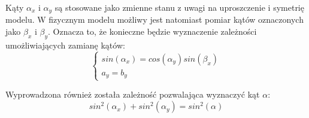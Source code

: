 \documentclass[10pt]{article}
\begin{document}
Kąty $\alpha_x$ i $\alpha_y$ są stosowane jako zmienne stanu z uwagi na uproszczenie i symetrię modelu. W fizycznym modelu możliwy jest natomiast pomiar kątów oznaczonych jako $\beta_x$ i $\beta_y$. Oznacza to, że konieczne będzie wyznaczenie zależności umożliwiających zamianę kątów:
\begin{equation}
\begin{cases}
sin(\alpha_x) = cos(\alpha_y)sin(\beta_x) \\
a_y = b_y
\end{cases}
\end{equation}

Wyprowadzona również została zależność pozwalająca wyznaczyć kąt $\alpha$:
\begin{equation}
sin^2(\alpha_x) + sin^2(\alpha_y) = sin^2(\alpha)
\end{equation}
\end{document}

